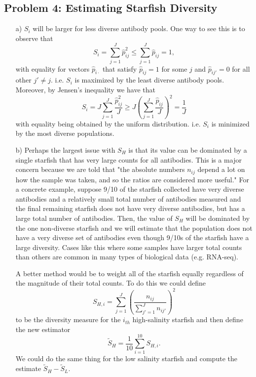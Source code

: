 \subsection*{Problem 4: Estimating Starfish Diversity}

\begin{enumerate}
\item[a)]
$S_i$ will be larger for less diverse antibody pools. One way to see this is to observe that 
\[
S_i = \sum_{j=1}^J \hat{p}_{ij}^2 \leq \sum_{j=1}^J \hat{p}_{ij} = 1,
\] 
with equality for vectors $\hat{p}_{i \cdot}$ that satisfy $\hat{p}_{ij} = 1$ for some $j$ and $\hat{p}_{ij'} = 0$ for all other $j' \neq j$. i.e. $S_i$ is maximized by the least diverse antibody pools. Moreover, by Jensen's inequality we have that 
\[
S_i =  J  \sum_{j=1}^J \frac{\hat{p}_{ij}^2}{J} \geq J \left( \sum_{j=1}^J \frac{\hat{p}_{ij}}{J} \right)^2 = \frac{1}{J}
\]
with equality being obtained by the uniform distribution. i.e. $S_i$ is minimized by the most diverse populations. 
\item[b)]
Perhaps the largest issue with $S_H$ is that its value can be dominated by a single starfish that has very large counts for all antibodies. This is a major concern because we are told that "the absolute numbers $n_{ij}$ depend  a  lot  on  how  the  sample  was  taken,  and  so  the  ratios  are  considered  more useful." For a concrete example, suppose 9/10 of the starfish collected have very diverse antibodies and a relatively small total number of antibodies measured and the final remaining starfish does not have very diverse antibodies, but has a large total number of antibodies. Then, the value of $S_H$ will be dominated by the one non-diverse starfish and we will estimate that the population does not have a very diverse set of antibodies even though 9/10s of the starfish have a large diversity. Cases like this where some samples have larger total counts than others are common in many types of biological data (e.g. RNA-seq).

A better method would be to weight all of the starfish equally regardless of the magnitude of their total counts. To do this we could define 
\[
S_{H,i} = \sum_{j=1}^J \left( \frac{n_{ij}}{\sum_{j'=1}^J n_{ij'}} \right)^2
\]
to be the diversity measure for the $i_{th}$ high-salinity starfish and then define the new estimator 
\[
\tilde{S}_H = \frac{1}{10} \sum_{i=1}^{10} S_{H,i}.
\]
We could do the same thing for the low salinity starfish and compute the estimate $\tilde{S}_H - \tilde{S}_L$.


\end{enumerate}
